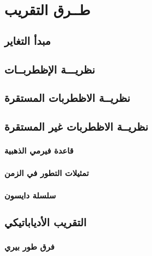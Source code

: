 \chapter{طــرق التقريب}

\label{Chapter5}


\section{مبدأ التغاير}

\section{نظريـــة الإظطربــات}

\section{نظريــة الاظطربات المستقرة}

\section{نظريــة الاظطربات غير المستقرة}

\subsection{قاعدة فيرمي الذهبية}

\subsection{تمثيلات التطور في الزمن}

\subsection{سلسلة دايسون}

\section{التقريب الأدياباتيكي}

\subsection{فرق طور بيري}
